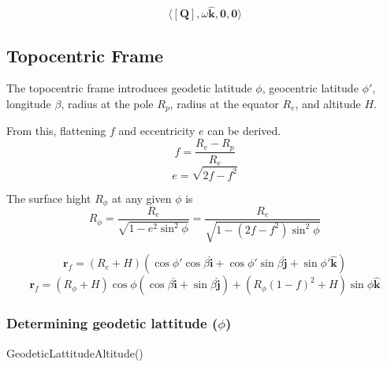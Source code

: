 \begin{equation}
    \label{rotating_geocentric_frame}
    \langle\left[\mathbf{Q}\right], \omega\hat{\mathbf{k}}, \mathbf{0}, \mathbf{0} \rangle
\end{equation}


\subsection{Topocentric Frame}
The topocentric frame introduces geodetic latitude $\phi$, geocentric latitude $\phi'$, longitude $\beta$, radius at the pole $R_p$,
radius at the equator $R_e$, and altitude $H$.

From this, flattening $f$ and eccentricity $e$ can be derived.
\begin{equation}
    \label{topocentric_flattening}
    f=\frac{R_e-R_p}{R_e}
\end{equation}
\begin{equation}
    \label{topocentric_ecc}
    e=\sqrt{2f-f^2}
\end{equation}


The surface hight $R_\phi$ at any given $\phi$ is
\begin{equation}
    \label{surface_height}
    R_\phi=\frac{R_e}{\sqrt{1-e^{2}\sin^{2}{\phi}}}=\frac{R_e}{\sqrt{1-\left(2f-f^2\right)\sin^2{\phi}}}
\end{equation}


\begin{equation}
    \label{topocentric_r_geocentric}
    \mathbf{r}_f=
    \left(R_{e}+H\right)\left(
        \cos{\phi'}\cos{\beta}\hat{\mathbf{i}} +
        \cos{\phi'}\sin{\beta}\hat{\mathbf{j}} +
        \sin{\phi'}\hat{\mathbf{k}}\right)
\end{equation}
\begin{equation}
    \label{topocentric_r_geodetic}
    \mathbf{r}_f=
    \left(R_\phi+H\right)\cos{\phi}\left(\cos{\beta}\hat{\mathbf{i}} + \sin{\beta}\hat{\mathbf{j}}\right) +
    \left(R_\phi\left(1-f\right)^{2}+H\right)\sin{\phi}\hat{\mathbf{k}}
\end{equation}

\subsubsection{Determining geodetic lattitude ($\phi$)}
\begin{function}
    \DontPrintSemicolon
    \caption{GeodeticLattitudeAltitude()}
\end{function}

